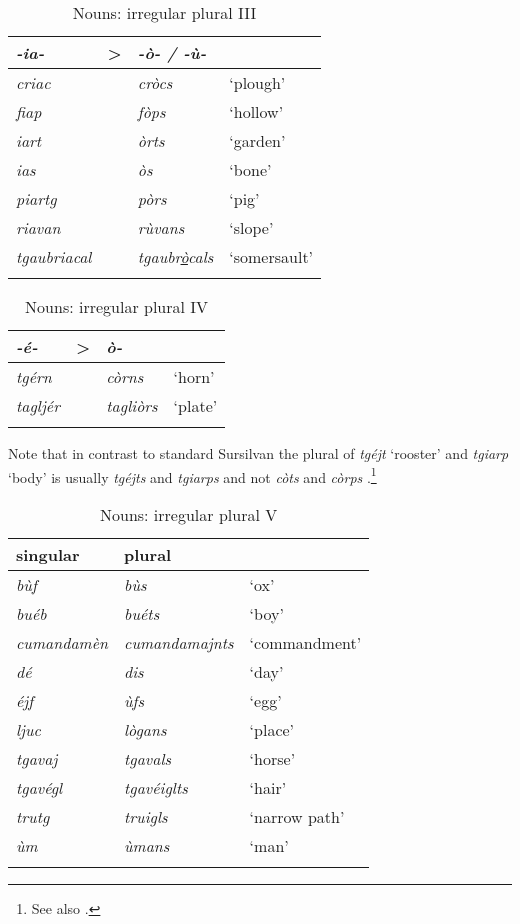 \begin{table}
\caption{Nouns: irregular plural III} 
\label{irregplIII}
 \begin{tabular}{llll}
  \lsptoprule
   \textit{-ia-} & > & \textit{-ò- / -ù-} \\
  \midrule
\textit{criac} && \textit{cròcs} & `plough'\\
\textit{fiap} && \textit{fòps} & `hollow'\\
\textit{iart}  && \textit{òrts} & `garden'\\
\textit{ias} && \textit{òs} & `bone' \\
\textit{piartg} && \textit{pòrs} & `pig'\\
\textit{riavan} && \textit{rùvans} & `slope'\\
\textit{tgaubriacal} && \textit{tgaubr\underline{ò}cals} & `somersault'  \\
  \lspbottomrule
 \end{tabular}
\end{table}

\begin{table}
	\caption{Nouns: irregular plural IV} 
	\label{irregplIV}
	\begin{tabular}{llll}
		\lsptoprule
		 \textit{-é-} & > & \textit{ò-} & \\
		\midrule
		 \textit{tgérn} & & \textit{còrns} & `horn'\\
		 \textit{tagljér} & & \textit{tagliòrs} & `plate'\\
		\lspbottomrule
	\end{tabular}
\end{table}

Note that in contrast to standard Sursilvan the plural of \textit{tgéjt} `rooster' and \textit{tgiarp} `body' is usually \textit{tgéjts} and \textit{tgiarps} and not \textit{còts} and \textit{còrps} .\footnote{See also .}


\begin{table}
\caption{Nouns: irregular plural V}
\label{irregplV}
 \begin{tabular}{lll}
  \lsptoprule
singular & plural \\
  \midrule
\textit{bùf} & \textit{bùs} & `ox'\\
\textit{buéb} & \textit{buéts} & `boy'\\
\textit{cumandamèn} & \textit{cumandamajnts} & `commandment'\\
\textit{dé} & \textit{dis} & `day'\\
\textit{éjf} & \textit{ùfs} & `egg'\\
\textit{ljuc}  & \textit{lògans} & `place'\\
\textit{tgavaj} & \textit{tgavals} & `horse'\\
\textit{tgavégl} & \textit{tgavéiglts} & `hair'\\ 
\textit{trutg} & \textit{truigls} & `narrow path'\\
\textit{ùm} & \textit{ùmans} & `man'\\
  \lspbottomrule
 \end{tabular}
\end{table}

